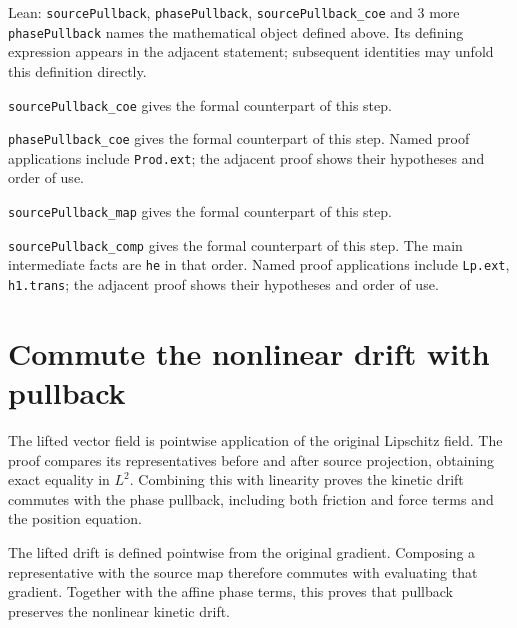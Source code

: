 \documentclass[11pt,a4paper]{article}
\begin{document}
\begin{leanbox}{Lean: \texttt{sourcePullback}, \texttt{phasePullback}, \texttt{sourcePullback\_\allowbreak{}coe} and 3 more}
\texttt{phase\allowbreak{}Pullback} names the mathematical object defined above. Its defining expression appears in the adjacent statement; subsequent identities may unfold this definition directly.




\texttt{source\allowbreak{}Pullback\_\allowbreak{}coe} gives the formal counterpart of this step.




\texttt{phase\allowbreak{}Pullback\_\allowbreak{}coe} gives the formal counterpart of this step. Named proof applications include \texttt{Prod.\allowbreak{}ext}; the adjacent proof shows their hypotheses and order of use.




\texttt{source\allowbreak{}Pullback\_\allowbreak{}map} gives the formal counterpart of this step.




\texttt{source\allowbreak{}Pullback\_\allowbreak{}comp} gives the formal counterpart of this step. The main intermediate facts are \texttt{he} in that order. Named proof applications include \texttt{Lp.\allowbreak{}ext}, \texttt{h1.\allowbreak{}trans}; the adjacent proof shows their hypotheses and order of use.
\end{leanbox}

\section{\texorpdfstring{Commute the nonlinear drift with pullback}{Commute the nonlinear drift with pullback}}


The lifted vector field is pointwise application of the original Lipschitz field. The proof compares its representatives before and after source projection, obtaining exact equality in \(L^{2}\). Combining this with linearity proves the kinetic drift commutes with the phase pullback, including both friction and force terms and the position equation.



The lifted drift is defined pointwise from the original gradient. Composing a representative with the source map therefore commutes with evaluating that gradient. Together with the affine phase terms, this proves that pullback preserves the nonlinear kinetic drift.
\end{document}
